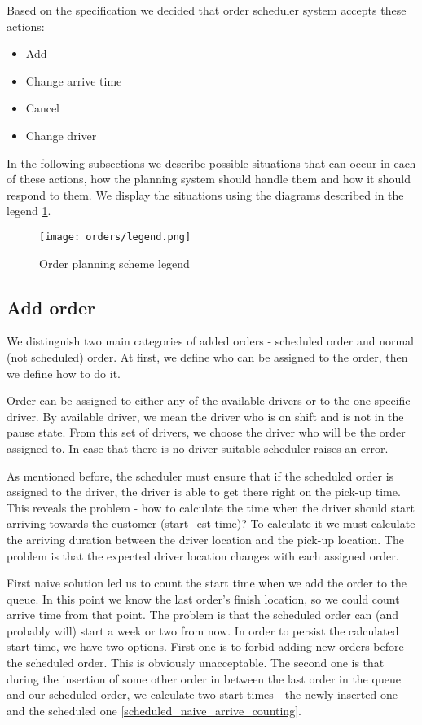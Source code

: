 Based on the specification we decided that order scheduler system accepts these actions:
\begin{itemize}
	\item Add
	\item Change arrive time
	\item Cancel
	\item Change driver
\end{itemize}


In the following subsections we describe possible situations that can occur in each of these actions, how the planning system should handle them and how it should respond to them. We display the situations using the diagrams described in the legend \ref{order-planning-legend}.

\begin{figure}[h]\centering
	\texttt{[image: orders/legend.png]}
	\caption{Order planning scheme legend}\label{order-planning-legend}
\end{figure} 



\subsection{Add order}
We distinguish two main categories of added orders - scheduled order and normal (not scheduled) order. At first, we define who can be assigned to the order, then we define how to do it.

Order can be assigned to either any of the available drivers or to the one specific driver. By available driver, we mean the driver who is on shift and is not in the pause state. From this set of drivers, we choose the driver who will be the order assigned to. In case that there is no driver suitable scheduler raises an error.

As mentioned before, the scheduler must ensure that if the scheduled order is assigned to the driver, the driver is able to get there right on the pick-up time. This reveals the problem - how to calculate the time when the driver should start arriving towards the customer (start\_est time)? To calculate it we must calculate the arriving duration between the driver location and the pick-up location. The problem is that the expected driver location changes with each assigned order.

First naive solution led us to count the start time when we add the order to the queue. In this point we know the last order's finish location, so we could count arrive time from that point. The problem is that the scheduled order can (and probably will) start a week or two from now. In order to persist the calculated start time, we have two options. First one is to forbid adding new orders before the scheduled order. This is obviously unacceptable. The second one is that during the insertion of some other order in between the last order in the queue and our scheduled order, we calculate two start times - the newly inserted one and the scheduled one \ref{scheduled_naive_arrive_counting}. 


